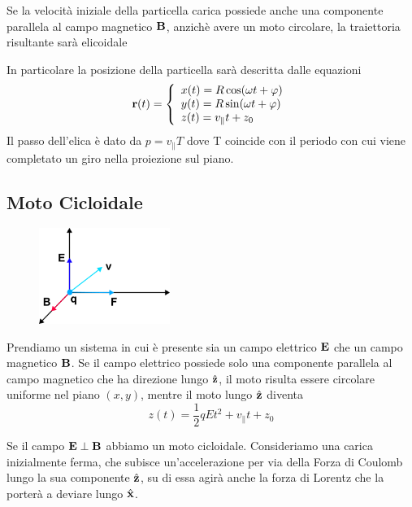 Se la velocit\`a iniziale della particella carica possiede anche una componente parallela al campo magnetico $\bold{B}$, anzich\`e avere un moto circolare, la traiettoria risultante sar\`a elicoidale 

In particolare la posizione della particella sar\`a descritta dalle equazioni
\begin{equation*}
	\bold{r}(t) = \left \{ \begin{array}{l}
		x(t) = R\cos(\omega t + \varphi)\\
		y(t) = R\sin(\omega t + \varphi)\\
		z(t) = v_{\parallel} t + z_0
	\end{array}\right.
\end{equation*}
Il passo dell'elica \`e dato da $p = v_{\parallel}T$ dove T coincide con il periodo con cui viene completato un giro nella proiezione sul piano.

\subsection{Moto Cicloidale}
\begin{figure} %
    \centering
    \includegraphics[width=0.38\textwidth]{images/cyclovector} %
\end{figure}
Prendiamo un sistema in cui \`e presente sia un campo elettrico $\bold{E}$ che un campo magnetico $\bold{B}$. Se il campo elettrico possiede solo una componente parallela al campo magnetico che ha direzione lungo $\hat{\bold{z}}$, il moto risulta essere circolare uniforme nel piano $(x,y)$, mentre il moto lungo $\hat{\bold{z}}$ diventa 
\begin{equation*}
	z(t) = \frac{1}{2}qEt^2 + v_{\parallel}t + z_0
\end{equation*}

Se il campo $\bold{E} \perp \bold{B}$ abbiamo un moto cicloidale. Consideriamo una carica inizialmente ferma, che subisce un'accelerazione per via della Forza di Coulomb lungo la sua componente $\hat{\bold{z}}$, su di essa agir\`a anche la forza di Lorentz che la porter\`a a deviare lungo $\hat{\bold{x}}$. 


